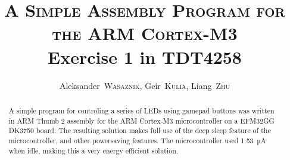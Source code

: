 \documentclass[a4,journal,twoside]{IEEEtran}
\title{
    \textsc{A Simple Assembly Program for the ARM Cortex-M3}\\
    Exercise 1 in TDT4258
}
\author{
    Aleksander~\textsc{Wasaznik},
    Geir~\textsc{Kulia},
    Liang~\textsc{Zhu}
}
\begin{document}
\maketitle

\begin{abstract}
    A simple program for controling a series of LEDs using gamepad buttons was written in ARM Thumb 2 assembly for the ARM Cortex-M3 microcontroller on a EFM32GG DK3750 board.
    The resulting solution makes full use of the deep sleep feature of the microcontroller, and other powersaving features.
    The microcontroller used \SI{1.53}{\micro\ampere} when idle, making this a very energy efficient solution.
\end{abstract}



\end{document}
